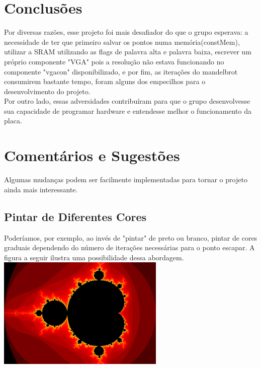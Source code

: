\documentclass[a4paper, 12pt]{article}
\begin{document}
\section{Conclusões}
Por diversas razões, esse projeto foi mais desafiador do que o grupo esperava: a necessidade de ter que primeiro salvar os pontos numa memória(constMem), utilizar a SRAM utilizando as flags de palavra alta e palavra baixa, escrever um próprio componente "VGA" pois a resolução não estava funcionando no componente "vgacon" disponibilizado, e por fim, as iterações do mandelbrot consumirem bastante tempo, foram alguns dos empecilhos para o desenvolvimento do projeto.\\
Por outro lado, essas adversidades contribuíram para que o grupo desenvolvesse sua capacidade de programar hardware e entendesse melhor o funcionamento da placa.\\

\section{Comentários e Sugestões}
Algumas mudanças podem ser facilmente implementadas para tornar o projeto ainda mais interessante.\\
\subsection{Pintar de Diferentes Cores}
Poderíamos, por exemplo, ao invés de "pintar" de preto ou branco, pintar de cores graduais dependendo do número de iterações necessárias para o ponto escapar. A figura a seguir ilustra uma possibilidade dessa abordagem.\\[1cm]

\includegraphics[width=0.6\textwidth]{./Mandelbrot-Color.png}~\\[2cm]
\end{document}
